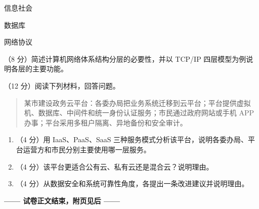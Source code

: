 \documentclass[a4paper,11pt]{article}
\begin{document}


\q 信息社会
\anslines{3cm}

\q 数据库
\anslines{3cm}

\q 网络协议
\anslines{3cm}


\q （8 分）简述计算机网络体系结构分层的必要性，并以 TCP/IP 四层模型为例说明各层的主要功能。
\anslines{5.5cm}


\q （12 分）阅读下列材料，回答问题。
\begin{quote}\small
某市建设政务云平台：各委办局把业务系统迁移到云平台；平台提供虚拟机、数据库、中间件和统一身份认证服务；市民通过政府网站或手机 APP 办事；平台采用多租户隔离、异地备份和安全审计。
\end{quote}
\begin{enumerate}[label=（\arabic*）, leftmargin=2.4em, itemsep=1pt]
  \item （4 分）用 IaaS、PaaS、SaaS 三种服务模式分析该平台，说明各委办局、平台运营方和市民分别主要使用哪一层服务。
  \item （4 分）该平台更适合公有云、私有云还是混合云？说明理由。
  \item （4 分）从数据安全和系统可靠性角度，各提出一条改进建议并说明理由。
\end{enumerate}
\anslines{12cm}

\vfill
\begin{center}
\textbf{—— 试卷正文结束，附页见后 ——}
\end{center}

\end{document}
